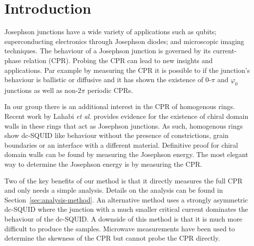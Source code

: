 \chapter{Introduction}
Josephson junctions have a wide variety of applications such as qubits\cite{placeNewMaterialPlatform2021,pechenezhskiySuperconductingQuasichargeQubit2020}; superconducting electronics through Josephson diodes\cite{zhangReconfigurableMagneticfieldfreeSuperconducting2023a,ciacciaGateTunableJosephson2023}; and microscopic imaging techniques\cite{clarkeSQUIDHandbook2004,rogSQUIDontipMagneticMicroscopy2022,pranceSensitivityDCSQUID2023}. The behaviour of a Josephson junction is governed by its current-phase relation (CPR). Probing the CPR can lead to new insights and applications. Par example by measuring the CPR it is possible to if the junction's behaviour is ballistic or diffusive\cite{muraniBallisticEdgeStates2017,endresCurrentPhaseRelation2023,kayyalhaHighlySkewedCurrent2020} and it has shown the existence of $0$-$\pi$ and $\varphi_0$ junctions\cite{frolovMeasurementCurrentPhaseRelation2004,muraniBallisticEdgeStates2017,strambiniJosephsonPhaseBattery2020,szombatiJosephsonPh0junctionNanowire2016} as well as non-$2\pi$ periodic CPRs\cite{endresCurrentPhaseRelation2023}.

In our group there is an additional interest in the CPR of homogenous  rings. Recent work by Lahabi \textit{et al.} provides evidence for the existence of chiral domain walls in these rings that act as Josephson junctions.\cite{lahabiSpintripletSupercurrentsOdd2018} As such, homogenous  rings show dc-SQUID like behaviour without the presence of constrictions, grain boundaries or an interface with a different material. Definitive proof for chiral domain walls can be found by measuring the Josephson energy.\cite{lahabiSpintripletSupercurrentsOdd2018,sigristRoleDomainWalls1999} The most elegant way to determine the Josephson energy is by measuring the CPR.

Two of the key benefits of our method is that it directly measures the full CPR and only needs a simple analysis. Details on the analysis can be found in Section~\ref{sec:analysis-method}. An alternative method uses a strongly asymmetric dc-SQUID where the junction with a much smaller critical current dominates the behaviour of the dc-SQUID.\cite{muraniBallisticEdgeStates2017,dellaroccaMeasurementCurrentPhaseRelation2007} A downside of this method is that it is much more difficult to produce the samples. Microwave measurements have been used to determine the skewness of the CPR but cannot probe the CPR directly.\cite{schmidtProbingCurrentphaseRelation2020}

